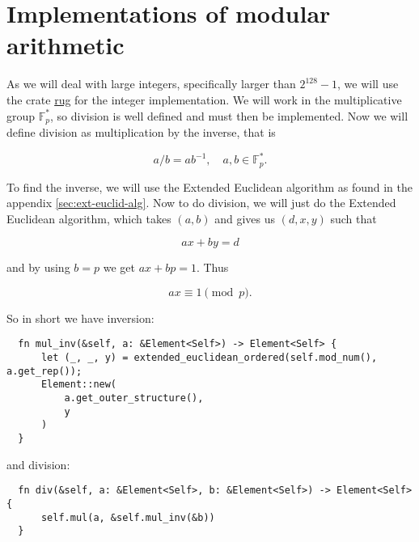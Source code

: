 \section{Implementations of modular arithmetic}

As we will deal with large integers, specifically larger than $2^{128}-1$, we will use the crate \href{https://docs.rs/rug/latest/rug/}{rug} for the integer implementation.
We will work in the multiplicative group $\mathbb{F}_p^*$, so division is well defined and must then be implemented.
Now we will define division as multiplication by the inverse, that is 

\begin{equation}
  a / b = ab^{-1}, \quad a, b \in \mathbb{F}_p^*.
  \label{eq:division}
\end{equation}

To find the inverse, we will use the Extended Euclidean algorithm as found in the appendix \ref{sec:ext-euclid-alg}.
Now to do division, we will just do the Extended Euclidean algorithm, which takes $(a, b)$ and gives us $(d, x, y)$ such that

\begin{equation}
  ax + by = d
  \label{eq:ext-euclid-alg}
\end{equation}

and by using $b = p$ we get $ax + bp = 1$. Thus

\begin{equation}
  ax \equiv 1 \pmod{p}.
\end{equation}

So in short we have inversion:

\begin{verbatim}
  fn mul_inv(&self, a: &Element<Self>) -> Element<Self> {
      let (_, _, y) = extended_euclidean_ordered(self.mod_num(), a.get_rep());
      Element::new(
          a.get_outer_structure(),
          y
      )
  }
\end{verbatim}

and division:

\begin{verbatim}
  fn div(&self, a: &Element<Self>, b: &Element<Self>) -> Element<Self> {
      self.mul(a, &self.mul_inv(&b))
  }
\end{verbatim}
